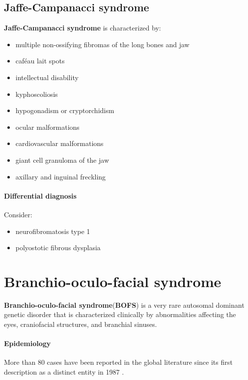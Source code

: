 \subsection{Jaffe-Campanacci syndrome}

\textbf{Jaffe-Campanacci syndrome} is characterized by:

\begin{itemize}
	\tightlist
	\item
	multiple non-ossifying fibromas of the long bones and jaw
	\item
	caféau lait spots
	\item
	intellectual disability
	\item
	kyphoscoliosis
	\item
	hypogonadism or cryptorchidism
	\item
	ocular malformations
	\item
	cardiovascular malformations
	\item
	giant cell granuloma of the jaw
	\item
	axillary and inguinal freckling 
\end{itemize}

\paragraph{Differential diagnosis}

Consider:

\begin{itemize}
	\tightlist
	\item
	neurofibromatosis type 1
	\item
	polyostotic fibrous dysplasia
\end{itemize}
\section{Branchio-oculo-facial syndrome}

\textbf{Branchio-oculo-facial syndrome}(\textbf{BOFS}) is a very rare autosomal dominant genetic disorder that is characterized clinically by abnormalities affecting the eyes, craniofacial structures, and branchial sinuses.

\paragraph{Epidemiology}

More than 80 cases have been reported in the global literature since its first description as a distinct entity in 1987 .

